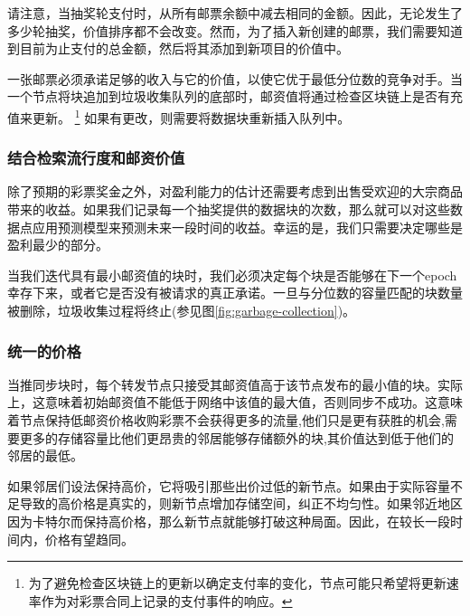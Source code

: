 请注意，当抽奖轮支付时，从所有邮票余额中减去相同的金额。因此，无论发生了多少轮抽奖，价值排序都不会改变。然而，为了插入新创建的邮票，我们需要知道到目前为止支付的总金额，然后将其添加到新项目的价值中。

一张邮票必须承诺足够的收入与它的价值，以使它优于最低分位数的竞争对手。当一个节点将块追加到垃圾收集队列的底部时，邮资值将通过检查区块链上是否有充值来更新。%
%
\footnote{为了避免检查区块链上的更新以确定支付率的变化，节点可能只希望将更新速率作为对彩票合同上记录的支付事件的响应。}
%
如果有更改，则需要将数据块重新插入队列中。 

\subsubsection{结合检索流行度和邮资价值}

除了预期的彩票奖金之外，对盈利能力的估计还需要考虑到出售受欢迎的大宗商品带来的收益。如果我们记录每一个抽奖提供的数据块的次数，那么就可以对这些数据点应用预测模型来预测未来一段时间的收益。幸运的是，我们只需要决定哪些是盈利最少的部分。 



当我们迭代具有最小邮资值的块时，我们必须决定每个块是否能够在下一个epoch幸存下来，或者它是否没有被请求的真正承诺。一旦与分位数的容量匹配的块数量被删除，垃圾收集过程将终止(参见图\ref{fig:garbage-collection})。

\subsubsection{统一的价格} 

当推同步块时，每个转发节点只接受其邮资值高于该节点发布的最小值的块。实际上，这意味着初始邮资值不能低于网络中该值的最大值，否则同步不成功。这意味着节点保持低邮资价格收购彩票不会获得更多的流量,他们只是更有获胜的机会,需要更多的存储容量比他们更昂贵的邻居能够存储额外的块,其价值达到低于他们的邻居的最低。

如果邻居们设法保持高价，它将吸引那些出价过低的新节点。如果由于实际容量不足导致的高价格是真实的，则新节点增加存储空间，纠正不均匀性。如果邻近地区因为卡特尔而保持高价格，那么新节点就能够打破这种局面。因此，在较长一段时间内，价格有望趋同。








